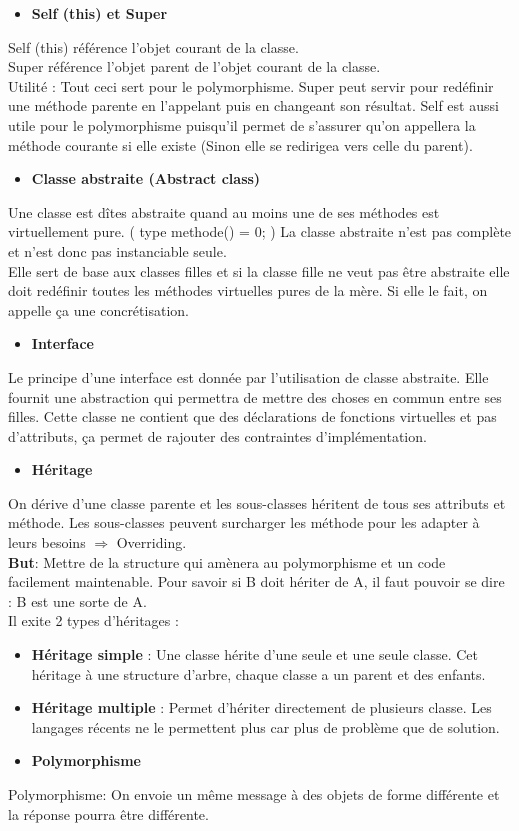 \begin{itemize}
	\item \textbf{Self (this) et Super}
\end{itemize}
\color[rgb]{0,0.48,0.58}
Self (this) référence l'objet courant de la classe.
\\Super référence l'objet parent de l'objet courant de la classe.
\\Utilité : Tout ceci sert pour le polymorphisme. Super peut servir pour redéfinir une méthode parente en l'appelant puis en changeant son résultat. Self est aussi utile pour le polymorphisme puisqu'il permet de s'assurer qu'on appellera la méthode courante si elle existe (Sinon elle se redirigea vers celle du parent).
\color[rgb]{0,0,0}

\begin{itemize}
	\item \textbf{Classe abstraite (Abstract class)}
\end{itemize}
\color[rgb]{0,0.48,0.58}
Une classe est dîtes abstraite quand au moins une de ses méthodes est virtuellement pure. ( type methode() = 0; ) La classe abstraite n'est pas complète et n'est donc pas instanciable seule.
\\Elle sert de base aux classes filles et si la classe fille ne veut pas être abstraite elle doit redéfinir toutes les méthodes virtuelles pures de la mère. Si elle le fait, on appelle ça une concrétisation.
\color[rgb]{0,0,0}


\begin{itemize}
	\item \textbf{Interface}
\end{itemize}
\color[rgb]{0,0.48,0.58}
Le principe d'une interface est donnée par l'utilisation de classe abstraite. Elle fournit une abstraction qui permettra de mettre des choses en commun entre ses filles. Cette classe ne contient que des déclarations de fonctions virtuelles et pas d’attributs, ça permet de rajouter des contraintes d’implémentation.
\color[rgb]{0,0,0}

\begin{itemize}
	\item \textbf{Héritage}
\end{itemize}
\color[rgb]{0,0.48,0.58}
On dérive d’une classe parente et les sous-classes héritent de tous ses attributs et méthode.
Les sous-classes peuvent surcharger les méthode pour les adapter à leurs besoins $\Rightarrow$ Overriding.
\\\textbf{But}: Mettre de la structure qui amènera au polymorphisme et un code facilement maintenable.
Pour savoir si B doit hériter de A, il faut pouvoir se dire : B est une sorte de A.
\\Il exite 2 types d'héritages :
\begin{itemize}
	\item \textbf{Héritage simple} : Une classe hérite d’une seule et une seule classe. Cet héritage à une structure d’arbre, chaque classe a un parent et des enfants.
	\item \textbf{Héritage multiple} : Permet d’hériter directement de plusieurs classe. Les langages récents ne le permettent plus car plus de problème que de solution.
\end{itemize}
\color[rgb]{0,0,0}

\begin{itemize}
	\item \textbf{Polymorphisme}
\end{itemize}
\textcolor[rgb]{0,0.48,0.58}{Polymorphisme: On envoie un même message à des objets de forme différente et la réponse pourra être différente.}